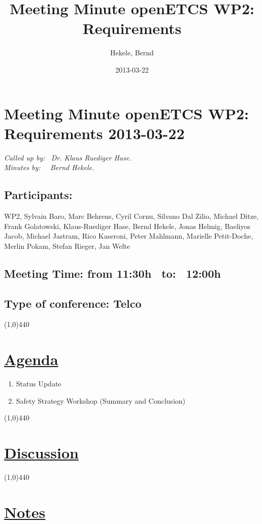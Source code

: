 \documentclass[a4paper]{article}
\title{Meeting Minute openETCS WP2: Requirements}
\author{Hekele, Bernd}
\date{2013-03-22}
\begin{document}
\section*{\large{Meeting Minute openETCS WP2: Requirements 2013-03-22}}

\emph{Called up by: \ Dr. Klaus Ruediger Hase.}\\
\emph{Minutes by: \ \  Bernd Hekele.}

\subsection*{Participants:} WP2, 
Sylvain Baro,
Marc Behrens, 
Cyril Cornu,
Silvano Dal Zilio,
Michael Ditze,
Frank Golatowski, 
Klaus-Ruediger Hase, 
Bernd Hekele,
Jonas Helmig,
Baeliyos Jacob,
Michael Jastram, 
Rico Kaseroni,
Peter Mahlmann, 
Marielle Petit-Doche, 
Merlin Pokam,
Stefan Rieger, 
Jan Welte\\


\subsection*{Meeting Time: from 11:30h \ to: \ 12:00h}

\subsection*{Type of conference: Telco}

\line(1,0){440}
\section*{\underline{Agenda}}
\begin{enumerate}
\item Status Update
\item Safety Strategy Workshop (Summary and Conclusion)
\end{enumerate}
\line(1,0){440}
\section*{\underline{Discussion}}


\line(1,0){440}
\section*{\underline{Notes}}
\end{document}
